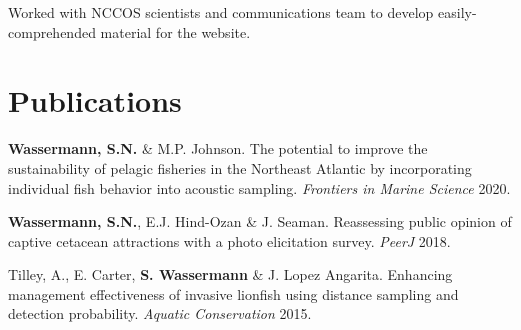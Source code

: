 \documentclass[a4paper]{deedy-resume} %
\begin{document}
\begin{flushleft}
\sectionspace %



Worked with NCCOS scientists and communications team to develop easily-comprehended material for the website.

\sectionspace 
\sectionspace



\section{Publications} 

\begin{tightitemize}
\item \textbf{Wassermann, S.N.} \& M.P. Johnson. The potential to improve the sustainability of pelagic fisheries in the Northeast Atlantic by incorporating individual fish behavior into acoustic sampling. \textit{Frontiers in Marine Science} 2020. 
\item \textbf{Wassermann, S.N.}, E.J. Hind-Ozan \& J. Seaman. 
Reassessing public opinion of captive cetacean attractions with a photo elicitation survey. \textit{PeerJ} 2018.
\item Tilley, A., E. Carter, \textbf{S. Wassermann} \& J. Lopez Angarita. Enhancing management effectiveness of invasive lionfish using distance sampling and detection probability. \textit{Aquatic Conservation} 2015.
\end{tightitemize}

\sectionspace


\end{flushleft}
\end{document}
